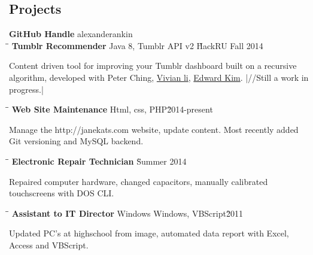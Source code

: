 \documentclass{res}
\begin{document}
\begin{resume}
\section{Projects}
   \vspace{-0.1in}	
   \begin{tabbing}
    {\bf GitHub Handle} alexanderankin\\
   \hspace{2.3in}\= \hspace{2.6in}\= \kill %
    {\bf Tumblr Recommender} \>Java 8, Tumblr API v2     \`HackRU Fall 2014\\
   \end{tabbing}\vspace{-20pt}      %
    Content driven tool for improving your Tumblr dashboard built on a recursive algorithm, developed with Peter Ching, \href{https://github.com/vivianli32)}{Vivian li}, \href{https://github.com/eddiekimosabe}{Edward Kim}. |//Still a work in progress.|
   \begin{tabbing}
   \hspace{2.3in}\= \hspace{2.6in}\= \kill %
    {\bf Web Site Maintenance} \>Html, css, PHP\`2014-present\\
   \end{tabbing}\vspace{-20pt}
    Manage the http://janekats.com website, update content. Most recently added Git versioning and MySQL backend.
   \begin{tabbing}%
   \hspace{2.3in}\= \hspace{2.6in}\= \kill %
   {\bf Electronic Repair Technician} \> \`Summer 2014\\
   \end{tabbing}\vspace{-20pt}
    Repaired computer hardware, changed capacitors, manually calibrated touchscreens with DOS CLI.
   \begin{tabbing}
   \hspace{2.3in}\= \hspace{2.6in}\= \kill %
    {\bf Assistant to IT Director} \>Windows Windows, VBScript\`2011\\
   \end{tabbing}\vspace{-20pt}
    Updated PC's at highschool from image, automated data report with Excel, Access and VBScript. 

 
\end{resume}
\end{document}
